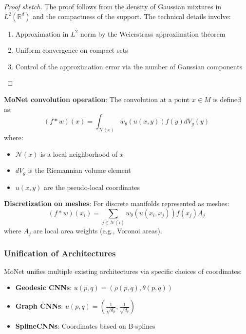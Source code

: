 \begin{proof}[Proof sketch]
The proof follows from the density of Gaussian mixtures in $L^2(\mathbb{R}^d)$ and the compactness of the support. The technical details involve:
\begin{enumerate}
    \item Approximation in $L^2$ norm by the Weierstrass approximation theorem
    \item Uniform convergence on compact sets
    \item Control of the approximation error via the number of Gaussian components
\end{enumerate}
\end{proof}

\textbf{MoNet convolution operation}: The convolution at a point $x \in M$ is defined as:
\begin{equation}
(f * w)(x) = \int_{\mathcal{N}(x)} w_\theta(u(x, y)) f(y) dV_g(y)
\end{equation}
where:
\begin{itemize}
    \item $\mathcal{N}(x)$ is a local neighborhood of $x$
    \item $dV_g$ is the Riemannian volume element
    \item $u(x, y)$ are the pseudo-local coordinates
\end{itemize}

\textbf{Discretization on meshes}: For discrete manifolds represented as meshes:
\begin{equation}
(f * w)(x_i) = \sum_{j \in \mathcal{N}(i)} w_\theta(u(x_i, x_j)) f(x_j) A_j
\end{equation}
where $A_j$ are local area weights (e.g., Voronoi areas).

\subsubsection{Unification of Architectures}

MoNet unifies multiple existing architectures via specific choices of coordinates:

\begin{itemize}
    \item \textbf{Geodesic CNNs}: $u(p,q) = (\rho(p,q), \theta(p,q))$
    \item \textbf{Graph CNNs}: $u(p,q) = (\frac{1}{\sqrt{d_p}}, \frac{1}{\sqrt{d_q}})$
    \item \textbf{SplineCNNs}: Coordinates based on B-splines
\end{itemize}

